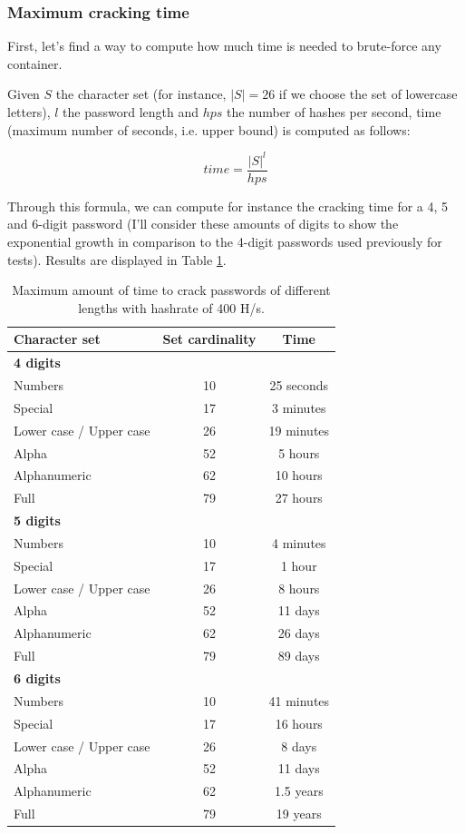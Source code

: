 \documentclass[12pt]{article}
\begin{document}
\subsubsection{Maximum cracking time}
\label{sec:time}

First, let's find a way to compute how much time is needed to brute-force any container.

Given $S$ the character set (for instance, $|S|=26$ if we choose the set of lowercase letters), $l$ the password length and $hps$ the number of hashes per second, time (maximum number of seconds, i.e. upper bound) is computed as follows:

\[time = \frac{|S|^l}{hps}\]

Through this formula, we can compute for instance the cracking time for a 4, 5 and 6-digit password (I'll consider these amounts of digits to show the exponential growth in comparison to the 4-digit passwords used previously for tests). Results are displayed in Table \ref{table:time}.

\begin{table}[!ht]
    \centering
    \begin{tabular}{lcc}
    \toprule
        \textbf{Character set} & \textbf{Set cardinality} & \textbf{Time} \\ 
        \midrule
        \textbf{4 digits} \\
        Numbers & 10 & 25 seconds \\
        Special & 17 & 3 minutes \\ 
        Lower case / Upper case & 26 & 19 minutes \\ 
        Alpha & 52 & 5 hours \\ 
        Alphanumeric & 62 & 10 hours \\ 
        Full & 79 & 27 hours \\ 
        \midrule
        \textbf{5 digits} \\
        Numbers & 10 & 4 minutes \\
        Special & 17 & 1 hour \\ 
        Lower case / Upper case & 26 & 8 hours \\ 
        Alpha & 52 & 11 days \\ 
        Alphanumeric & 62 & 26 days \\ 
        Full & 79 & 89 days \\ 
        \midrule
        \textbf{6 digits} \\
        Numbers & 10 & 41 minutes \\
        Special & 17 & 16 hours \\ 
        Lower case / Upper case & 26 & 8 days \\ 
        Alpha & 52 & 11 days \\ 
        Alphanumeric & 62 & 1.5 years \\ 
        Full & 79 & 19 years \\ 
    \bottomrule
    \end{tabular}
    \caption{Maximum amount of time to crack passwords of different lengths with hashrate of 400 H/s.}
    \label{table:time}
\end{table}
\end{document}
